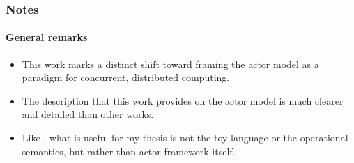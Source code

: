 \subsubsection*{Notes}
\paragraph{General remarks}
\begin{itemize}
\item This work marks a distinct shift toward framing the actor model as a paradigm for concurrent, distributed computing.
\item The description that this work provides on the actor model is much clearer and detailed than other works.
\item Like \cite{Clinger1981}, what is useful for my thesis is not the toy language or the operational semantics, but rather than actor framework itself.
\end{itemize}

